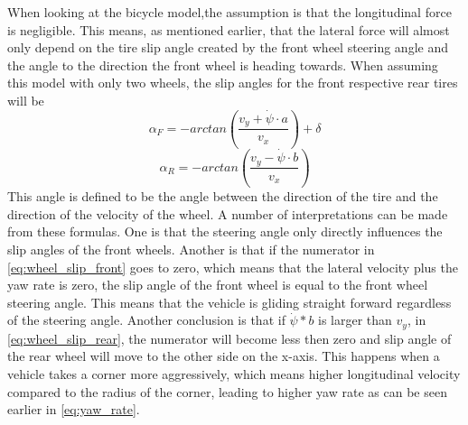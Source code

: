 When looking at the bicycle model,the assumption is that the longitudinal force is negligible. This means, as mentioned earlier, that the lateral force will almost only depend on the tire slip angle created by the front wheel steering angle and the angle to the direction the front wheel is heading towards. When assuming this model with only two wheels, the slip angles for the front respective rear tires will be
\begin{equation} \label{eq:wheel_slip_front}
	\alpha _{F} = -arctan(\dfrac{v_{y} + \dot \psi  \cdot a}{v_{x}}) + \delta
\end{equation}
\begin{equation} \label{eq:wheel_slip_rear}
\alpha _{R} = -arctan(\dfrac{v_{y} - \dot \psi  \cdot b}{v_{x}})
\end{equation}
This angle is defined to be the angle between the direction of the tire and the direction of the velocity of the wheel. A number of interpretations can be made from these formulas. One is that the steering angle only directly influences the slip angles of the front wheels. Another is that if the numerator in \ref{eq:wheel_slip_front} goes to zero, which means that the lateral velocity plus the yaw rate is zero, the slip angle of the front wheel is equal to the front wheel steering angle. This means that the vehicle is gliding straight forward regardless of the steering angle. Another conclusion is that if $ \dot \psi *b $ is larger than $ v_{y} $, in \ref{eq:wheel_slip_rear}, the numerator will become less then zero and slip angle of the rear wheel will move to the other side on the x-axis. This happens when a vehicle takes a corner more aggressively, which means higher longitudinal velocity compared to the radius of the corner, leading to higher yaw rate as can be seen earlier in \ref{eq:yaw_rate}.

